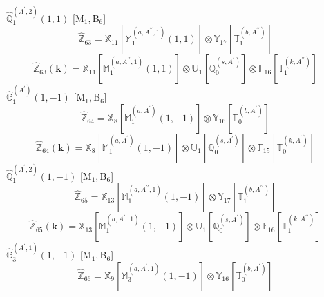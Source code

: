 \documentclass[fleqn,10pt,landscape]{article}
\begin{document}
\begin{itemize}
\begin{dmath*}
\end{dmath*}
\vspace{4mm}
\noindent {} $\,\,\,\hat{\mathbb{Q}}_{1}^{(A^{\prime},2)}(1,1)$ [M$_{1}$,\,B$_{6}$]
\begin{dmath*}
\hat{\mathbb{Z}}_{63}=\mathbb{X}_{11}[\mathbb{M}_{1}^{(a,A^{\prime\prime},1)}(1,1)] \otimes\mathbb{Y}_{17}[\mathbb{T}_{1}^{(b,A^{\prime\prime})}]
\end{dmath*}
\begin{dmath*}
\hat{\mathbb{Z}}_{63}(\bm{k})=\mathbb{X}_{11}[\mathbb{M}_{1}^{(a,A^{\prime\prime},1)}(1,1)] \otimes\mathbb{U}_{1}[\mathbb{Q}_{0}^{(s,A^{\prime})}] \otimes\mathbb{F}_{16}[\mathbb{T}_{1}^{(k,A^{\prime\prime})}]
\end{dmath*}
\vspace{4mm}
\noindent {} $\,\,\,\hat{\mathbb{G}}_{1}^{(A^{\prime})}(1,-1)$ [M$_{1}$,\,B$_{6}$]
\begin{dmath*}
\hat{\mathbb{Z}}_{64}=\mathbb{X}_{8}[\mathbb{M}_{1}^{(a,A^{\prime})}(1,-1)] \otimes\mathbb{Y}_{16}[\mathbb{T}_{0}^{(b,A^{\prime})}]
\end{dmath*}
\begin{dmath*}
\hat{\mathbb{Z}}_{64}(\bm{k})=\mathbb{X}_{8}[\mathbb{M}_{1}^{(a,A^{\prime})}(1,-1)] \otimes\mathbb{U}_{1}[\mathbb{Q}_{0}^{(s,A^{\prime})}] \otimes\mathbb{F}_{15}[\mathbb{T}_{0}^{(k,A^{\prime})}]
\end{dmath*}
\vspace{4mm}
\noindent {} $\,\,\,\hat{\mathbb{Q}}_{1}^{(A^{\prime},2)}(1,-1)$ [M$_{1}$,\,B$_{6}$]
\begin{dmath*}
\hat{\mathbb{Z}}_{65}=\mathbb{X}_{13}[\mathbb{M}_{1}^{(a,A^{\prime\prime},1)}(1,-1)] \otimes\mathbb{Y}_{17}[\mathbb{T}_{1}^{(b,A^{\prime\prime})}]
\end{dmath*}
\begin{dmath*}
\hat{\mathbb{Z}}_{65}(\bm{k})=\mathbb{X}_{13}[\mathbb{M}_{1}^{(a,A^{\prime\prime},1)}(1,-1)] \otimes\mathbb{U}_{1}[\mathbb{Q}_{0}^{(s,A^{\prime})}] \otimes\mathbb{F}_{16}[\mathbb{T}_{1}^{(k,A^{\prime\prime})}]
\end{dmath*}
\vspace{4mm}
\noindent {} $\,\,\,\hat{\mathbb{G}}_{3}^{(A^{\prime},1)}(1,-1)$ [M$_{1}$,\,B$_{6}$]
\begin{dmath*}
\hat{\mathbb{Z}}_{66}=\mathbb{X}_{9}[\mathbb{M}_{3}^{(a,A^{\prime},1)}(1,-1)] \otimes\mathbb{Y}_{16}[\mathbb{T}_{0}^{(b,A^{\prime})}]
\end{dmath*}
\begin{dmath*}

\end{dmath*}
\end{itemize}
\end{document}
